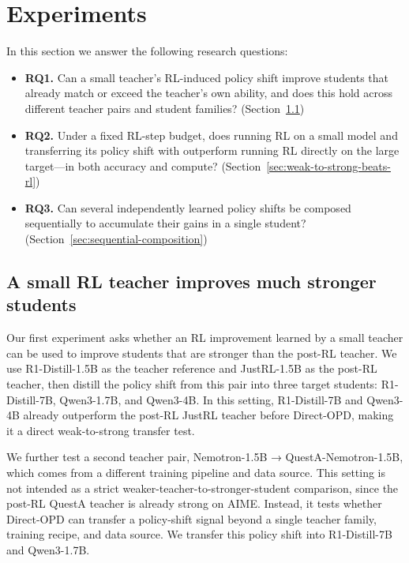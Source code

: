 \section{Experiments}

In this section we answer the following research questions:
\begin{itemize}
    \item \textbf{RQ1.} Can a small teacher's RL-induced policy shift improve
    students that already match or exceed the teacher's own ability, and does
    this hold across different teacher pairs and student families?
    (Section~\ref{sec:small-teacher-stronger})
    \item \textbf{RQ2.} Under a fixed RL-step budget, does running RL on a small model
    and transferring its policy shift with \method{} outperform running RL
    directly on the large target---in both accuracy and compute?
    (Section~\ref{sec:weak-to-strong-beats-rl})
    \item \textbf{RQ3.} Can several independently learned policy shifts be
    composed sequentially to accumulate their gains in a single student?
    (Section~\ref{sec:sequential-composition})
\end{itemize}

\subsection{A small RL teacher improves much stronger students}
\label{sec:small-teacher-stronger}

Our first experiment asks whether an RL improvement learned by a small teacher can be used to improve students that are stronger than the post-RL teacher. We use R1-Distill-1.5B as the teacher reference and JustRL-1.5B as the post-RL teacher, then distill the policy shift from this pair into three target students: R1-Distill-7B, Qwen3-1.7B, and Qwen3-4B. In this setting, R1-Distill-7B and Qwen3-4B already outperform the post-RL JustRL teacher before Direct-OPD, making it a direct weak-to-strong transfer test.

We further test a second teacher pair, Nemotron-1.5B → QuestA-Nemotron-1.5B, which comes from a different training pipeline and data source. This setting is not intended as a strict weaker-teacher-to-stronger-student comparison, since the post-RL QuestA teacher is already strong on AIME. Instead, it tests whether Direct-OPD can transfer a policy-shift signal beyond a single teacher family, training recipe, and data source. We transfer this policy shift into R1-Distill-7B and Qwen3-1.7B.

